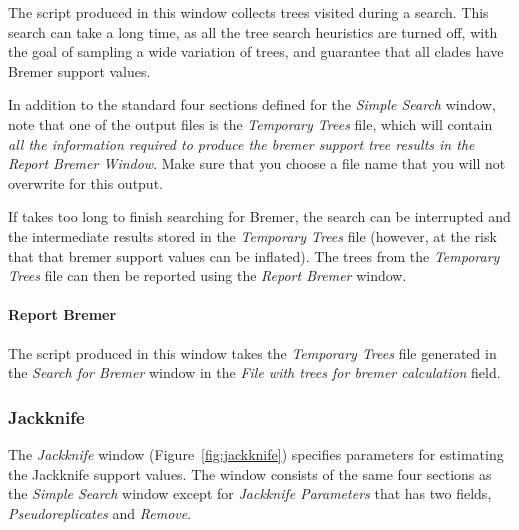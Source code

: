 The script produced in this window collects trees visited during a search. This
search can take a long time, as all the tree search heuristics are turned off,
with the goal of sampling a wide variation of trees, and guarantee that all
clades have Bremer support values. 

In addition to the standard four sections defined for the \emph{Simple Search} window,
note that one of the output files is the \emph{Temporary Trees} file, which will
contain \emph{all the information required to produce the bremer support tree
results in the Report Bremer Window}. Make sure that you choose a file name that you
will not overwrite for this output.

If \poy takes too long to finish searching for Bremer, the search can be interrupted and the intermediate results stored in the \emph{Temporary Trees} file (however, at the risk that that bremer support values can be inflated). The trees from the \emph{Temporary Trees} file can then be reported using the \emph{Report Bremer} window.

\paragraph{Report Bremer}
The script produced in this window takes the \emph{Temporary Trees} file generated in the \emph{Search for Bremer} window in the \emph{File with trees for bremer calculation} field. 

\subsubsection{Jackknife}

The \emph{Jackknife} window (Figure~\ref{fig:jackknife}) specifies parameters for estimating the
Jackknife support values. The window consists of the same
four sections as the \emph{Simple Search} window except for
\emph{Jackknife Parameters} that has two fields, \emph{Pseudoreplicates}
and \emph{Remove}.

